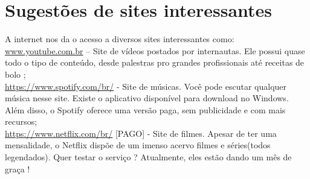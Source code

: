 \documentclass[hidelinks,12pt]{article}
\begin{document}
\section{Sugestões de sites interessantes}

A internet nos da o acesso a diversos sites interessantes como:\\

\url{www.youtube.com.br} – Site de vídeos postados por internautas. Ele possui quase todo o tipo de conteúdo, desde palestras pro grandes profissionais até receitas de bolo ;\\

\url{https://www.spotify.com/br/} - Site de músicas. Você pode escutar qualquer música nesse site. Existe o aplicativo disponível para download no Windows. Além disso, o Spotify oferece uma versão paga, sem publicidade e com mais recursos;\\

\url{https://www.netflix.com/br/} [PAGO] - Site de filmes. Apesar de ter uma mensalidade, o Netflix dispõe de um imenso acervo filmes e séries(todos legendados). Quer testar o serviço ? Atualmente, eles estão dando um mês de graça !
\end{document}
